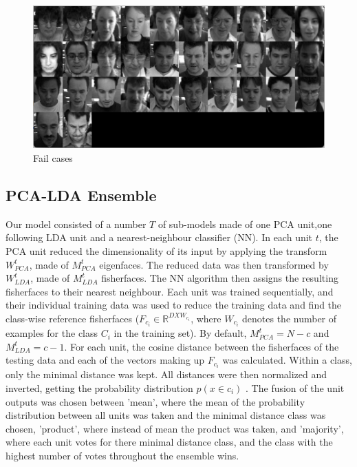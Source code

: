 \documentclass[10pt,technote]{IEEEtran}
\begin{document}
\begin{figure}[htb!]
    \centering
    \includegraphics[width = \linewidth]{../results/ex2LDA/LDA_Example_Failiures.png}
    \caption{Fail cases}
    \label{fig:MLDA_fail}
\end{figure}

\subsection{PCA-LDA Ensemble}

Our model consisted of a number $T$ of sub-models made of one PCA unit,one following LDA unit and a nearest-neighbour classifier (NN). In each unit $t$, the PCA unit reduced the dimensionality of its input by applying the transform $W_{PCA}^t$, made of $M_{PCA}^t$ eigenfaces. The reduced data was then transformed by $W_{LDA}^t$, made of $M_{LDA}^t$ fisherfaces. The NN algorithm then assigns the resulting fisherfaces to their nearest neighbour. Each unit was trained sequentially, and their individual training data was used to reduce the training data and find the class-wise reference fisherfaces ($F_{c_i} \in \mathbb{R}^{D X W_{c_i}}$, where $W_{c_i}$ denotes the number of examples for the class $C_i$ in the training set).  By default, $M_{PCA}^t = N - c$ and $M_{LDA}^t = c - 1$. For each unit,  the cosine distance between the fisherfaces of the testing data and each of the vectors making up $F_{c_i}$ was calculated. Within a class, only the minimal distance was kept. All distances were then normalized and inverted, getting the probability distribution $p(x \in c_i)$ . The fusion of the unit outputs was chosen between 'mean', where the mean of the probability distribution between all units was taken and the minimal distance class was chosen, 'product', where instead of mean the product was taken, and 'majority', where each unit votes for there minimal distance class, and the class with the highest number of votes throughout the ensemble wins.
\end{document}
